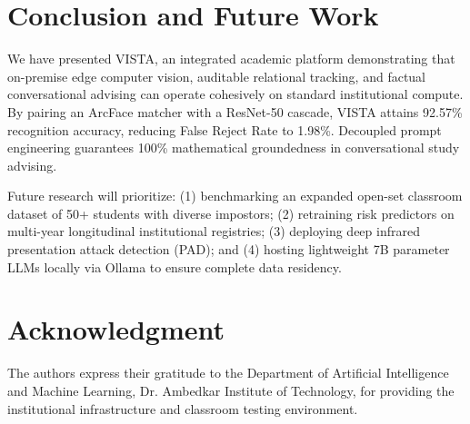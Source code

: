 \documentclass[conference]{IEEEtran}
\begin{document}
\section{Conclusion and Future Work}
We have presented VISTA, an integrated academic platform demonstrating that on-premise edge computer vision, auditable relational tracking, and factual conversational advising can operate cohesively on standard institutional compute. By pairing an ArcFace matcher with a ResNet-50 cascade, VISTA attains 92.57\% recognition accuracy, reducing False Reject Rate to 1.98\%. Decoupled prompt engineering guarantees 100\% mathematical groundedness in conversational study advising.

Future research will prioritize: (1) benchmarking an expanded open-set classroom dataset of 50+ students with diverse impostors; (2) retraining risk predictors on multi-year longitudinal institutional registries; (3) deploying deep infrared presentation attack detection (PAD); and (4) hosting lightweight 7B parameter LLMs locally via Ollama to ensure complete data residency.

\section*{Acknowledgment}
The authors express their gratitude to the Department of Artificial Intelligence and Machine Learning, Dr. Ambedkar Institute of Technology, for providing the institutional infrastructure and classroom testing environment.



\end{document}
